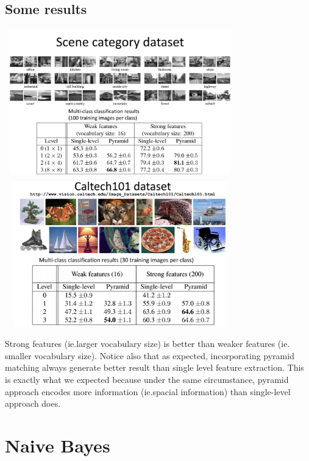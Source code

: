 \documentclass{article}
\begin{document}
\subsection{Some results}
\begin{center}
\includegraphics[width=10cm,height=6.4cm]{pyramid_data1.PNG}
\includegraphics[width=10cm,height=6.4cm]{pyramid_data2.PNG}
\end{center}
Strong features (ie.larger vocabulary size) is better than weaker features (ie. smaller vocabulary size). Notice also that as expected, incorporating pyramid matching always generate better result than single level feature extraction. This is exactly what we expected because under the same circumstance, pyramid approach encodes more information (ie.spacial information) than single-level approach does.

\section{Naive Bayes}
\end{document}
